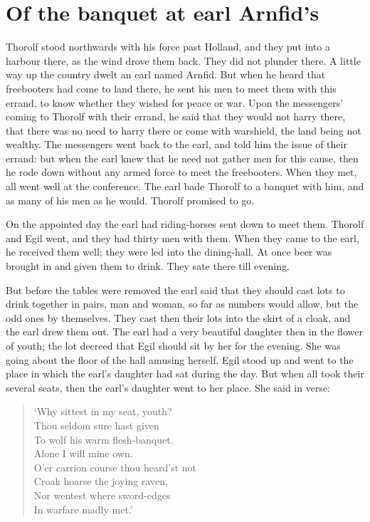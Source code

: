 \chapter{Of the banquet at earl Arnfid's}

Thorolf stood northwards with his force past Holland, and they put into a harbour there, as the wind drove them back. They did not plunder there. A little way up the country dwelt an earl named Arnfid. But when he heard that freebooters had come to land there, he sent his men to meet them with this errand, to know whether they wished for peace or war. Upon the messengers' coming to Thorolf with their errand, he said that they would not harry there, that there was no need to harry there or come with warshield, the land being not wealthy. The messengers went back to the earl, and told him the issue of their errand: but when the earl knew that he need not gather men for this cause, then he rode down without any armed force to meet the freebooters. When they met, all went well at the conference. The earl bade Thorolf to a banquet with him, and as many of his men as he would. Thorolf promised to go.

On the appointed day the earl had riding-horses sent down to meet them. Thorolf and Egil went, and they had thirty men with them. When they came to the earl, he received them well; they were led into the dining-hall. At once beer was brought in and given them to drink. They sate there till evening.

But before the tables were removed the earl said that they should cast lots to drink together in pairs, man and woman, so far as numbers would allow, but the odd ones by themselves. They cast then their lots into the skirt of a cloak, and the earl drew them out. The earl had a very beautiful daughter then in the flower of youth; the lot decreed that Egil should sit by her for the evening. She was going about the floor of the hall amusing herself. Egil stood up and went to the place in which the earl's daughter had sat during the day. But when all took their several seats, then the earl's daughter went to her place. She said in verse:

\begin{verse}
`Why sittest in my seat, youth? \\
Thou seldom sure hast given \\ 
To wolf his warm flesh-banquet. \\
Alone I will mine own. \\
O'er carrion course thou heard'st not \\
Croak hoarse the joying raven, \\
Nor wentest where sword-edges \\
In warfare madly met.' \\
\end{verse}

